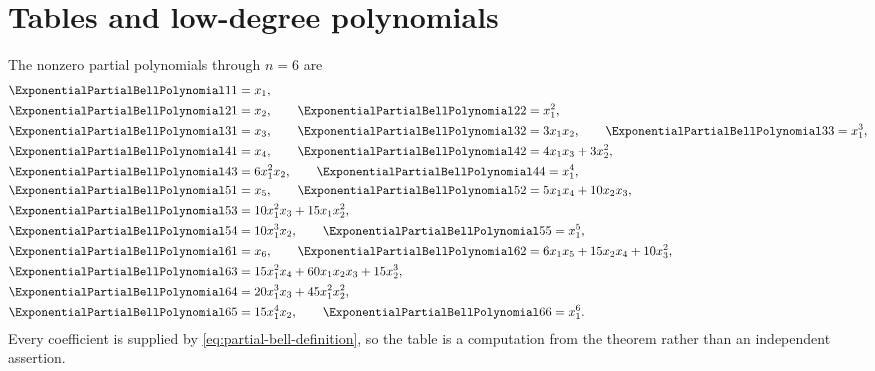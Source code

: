 \documentclass[11pt,a4paper,oneside,openany]{book}
\theoremstyle{definition}
\theoremstyle{remark}
\begin{document}
\section{Tables and low-degree polynomials}
The nonzero partial polynomials through $n=6$ are
\begin{align*}
\ExponentialPartialBellPolynomial11&=x_1,\\
\ExponentialPartialBellPolynomial21&=x_2,\qquad \ExponentialPartialBellPolynomial22=x_1^2,\\
\ExponentialPartialBellPolynomial31&=x_3,\qquad \ExponentialPartialBellPolynomial32=3x_1x_2,\qquad \ExponentialPartialBellPolynomial33=x_1^3,\\
\ExponentialPartialBellPolynomial41&=x_4,\qquad \ExponentialPartialBellPolynomial42=4x_1x_3+3x_2^2,\\
\ExponentialPartialBellPolynomial43&=6x_1^2x_2,\qquad \ExponentialPartialBellPolynomial44=x_1^4,\\
\ExponentialPartialBellPolynomial51&=x_5,\qquad \ExponentialPartialBellPolynomial52=5x_1x_4+10x_2x_3,\\
\ExponentialPartialBellPolynomial53&=10x_1^2x_3+15x_1x_2^2,\\
\ExponentialPartialBellPolynomial54&=10x_1^3x_2,\qquad \ExponentialPartialBellPolynomial55=x_1^5,\\
\ExponentialPartialBellPolynomial61&=x_6,\qquad \ExponentialPartialBellPolynomial62=6x_1x_5+15x_2x_4+10x_3^2,\\
\ExponentialPartialBellPolynomial63&=15x_1^2x_4+60x_1x_2x_3+15x_2^3,\\
\ExponentialPartialBellPolynomial64&=20x_1^3x_3+45x_1^2x_2^2,\\
\ExponentialPartialBellPolynomial65&=15x_1^4x_2,\qquad \ExponentialPartialBellPolynomial66=x_1^6.
\end{align*}
Every coefficient is supplied by \eqref{eq:partial-bell-definition}, so the table
is a computation from the theorem rather than an independent assertion.
\end{document}
